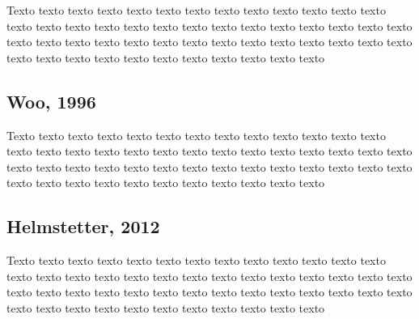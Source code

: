 Texto texto texto texto texto texto texto texto texto texto texto texto texto
texto texto texto texto texto texto texto texto texto texto texto texto texto
texto texto texto texto texto texto texto texto texto texto texto texto texto
texto texto texto texto texto texto texto texto texto texto texto texto texto



\subsection{Woo, 1996}
\label{sec:acidos_nucleicos}

Texto texto texto texto texto texto texto texto texto texto texto texto texto
texto texto texto texto texto texto texto texto texto texto texto texto texto
texto texto texto texto texto texto texto texto texto texto texto texto texto
texto texto texto texto texto texto texto texto texto texto texto texto texto



\subsection{Helmstetter, 2012}
\label{sec:acidos_nucleicos}

Texto texto texto texto texto texto texto texto texto texto texto texto texto
texto texto texto texto texto texto texto texto texto texto texto texto texto
texto texto texto texto texto texto texto texto texto texto texto texto texto
texto texto texto texto texto texto texto texto texto texto texto texto texto


